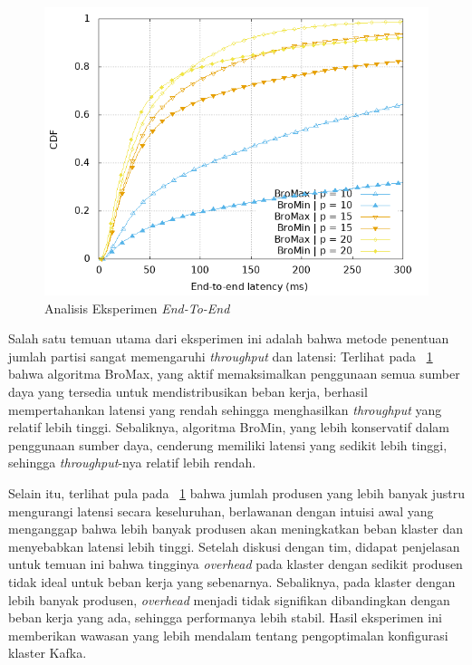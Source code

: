 \begin{figure}
	\centering
	\includegraphics[width=1\textwidth]
	{assets/pics/003-latency-cdf.png}
	\caption{Analisis Eksperimen \textit{End-To-End}}
	\label{fig:latency-cdf}
\end{figure}

Salah satu temuan utama dari eksperimen ini adalah bahwa metode penentuan jumlah partisi sangat memengaruhi \textit{throughput} dan latensi: Terlihat pada \pic~\ref{fig:latency-cdf} bahwa algoritma BroMax, yang aktif memaksimalkan penggunaan semua sumber daya yang tersedia untuk mendistribusikan beban kerja, berhasil mempertahankan latensi yang rendah sehingga menghasilkan \textit{throughput} yang relatif lebih tinggi. Sebaliknya, algoritma BroMin, yang lebih konservatif dalam penggunaan sumber daya, cenderung memiliki latensi yang sedikit lebih tinggi, sehingga \textit{throughput}-nya relatif lebih rendah.

Selain itu, terlihat pula pada \pic~\ref{fig:latency-cdf} bahwa jumlah produsen yang lebih banyak justru mengurangi latensi secara keseluruhan, berlawanan dengan intuisi awal yang menganggap bahwa lebih banyak produsen akan meningkatkan beban klaster dan menyebabkan latensi lebih tinggi. Setelah diskusi dengan tim, didapat penjelasan untuk temuan ini bahwa tingginya \textit{overhead} pada klaster dengan sedikit produsen tidak ideal untuk beban kerja yang sebenarnya. Sebaliknya, pada klaster dengan lebih banyak produsen, \textit{overhead} menjadi tidak signifikan dibandingkan dengan beban kerja yang ada, sehingga performanya lebih stabil. Hasil eksperimen ini memberikan wawasan yang lebih mendalam tentang pengoptimalan konfigurasi klaster Kafka.

